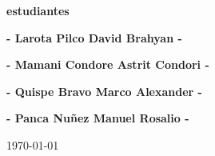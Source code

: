 \begin{titlepage}
\begin{center}
        {\large{\textbf{estudiantes}}}
        \par\vspace{2mm} %
        {\large{\textbf{- Larota Pilco David Brahyan -}}}
        \par\vspace{2mm} %
        {\large{\textbf{- Mamani Condore Astrit Condori -}}}
        \par\vspace{2mm} %
        {\large{\textbf{- Quispe Bravo Marco Alexander -}}}
        \par\vspace{2mm} %
        {\large{\textbf{- Panca Nuñez Manuel Rosalio -}}}
         \par\vspace{4mm}
        \today

    \end{center}
\end{titlepage}

